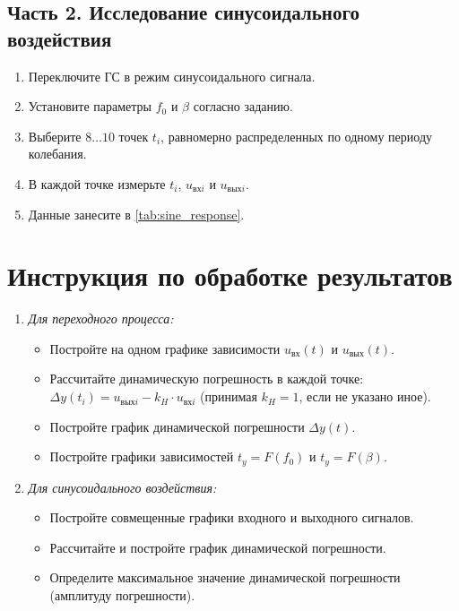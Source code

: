\subsection*{Часть 2. Исследование синусоидального воздействия}
\begin{enumerate}
    \item Переключите ГС в режим синусоидального сигнала.
    \item Установите параметры $f_0$ и $\beta$ согласно заданию.
    \item Выберите $8\dots10$ точек $t_i$, равномерно распределенных по одному периоду колебания.
    \item В каждой точке измерьте $t_i$, $u_{\text{вх} i}$ и $u_{\text{вых} i}$.
    \item Данные занесите в \cref{tab:sine_response}.
\end{enumerate}

\section*{Инструкция по обработке результатов}
\begin{enumerate}
    \item \textit{Для переходного процесса:}
    \begin{itemize}
        \item Постройте на одном графике зависимости $u_{\text{вх}}(t)$ и $u_{\text{вых}}(t)$.
        \item Рассчитайте динамическую погрешность в каждой точке: $\Delta y(t_i) = u_{\text{вых} i} - k_H \cdot u_{\text{вх} i}$ (принимая $k_H = 1$, если не указано иное).
        \item Постройте график динамической погрешности $\Delta y(t)$.
        \item Постройте графики зависимостей $t_y = F(f_0)$ и $t_y = F(\beta)$.
    \end{itemize}
    \item \textit{Для синусоидального воздействия:}
    \begin{itemize}
        \item Постройте совмещенные графики входного и выходного сигналов.
        \item Рассчитайте и постройте график динамической погрешности.
        \item Определите максимальное значение динамической погрешности (амплитуду погрешности).
    \end{itemize}
\end{enumerate}